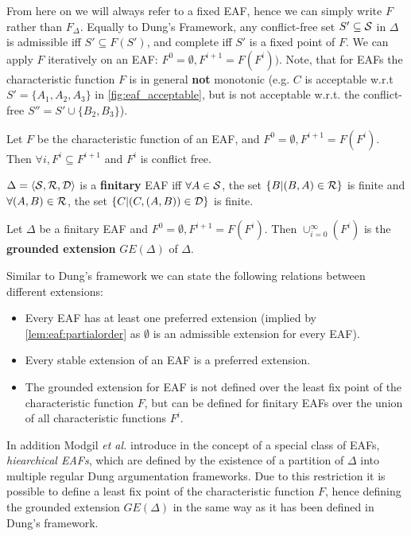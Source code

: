 From here on we will always refer to a fixed \gls{EAF}, hence we can simply write $F$ rather than $F_\Delta$. Equally to Dung's Framework, any conflict-free set $S' \subseteq \S$ in $\Delta$ is admissible iff $S' \subseteq F(S')$, and complete iff $S'$ is a fixed point of $F$. We can apply $F$ iteratively on an \gls{EAF}: $F^0 = \emptyset, F^{i+1} = F(F^i))$. Note, that for \glspl{EAF} the characteristic function $F$ is in general \textbf{not} monotonic (e.g. $C$ is acceptable w.r.t $S'= \{A_1, A_2, A_3\}$ in \autoref{fig:eaf_acceptable}, but is not acceptable w.r.t. the conflict-free $S'' = S' \cup \{B_2, B_3\}$).
\begin{lemma}
Let $F$ be the characteristic function of an \gls{EAF}, and $F^0 = \emptyset, F^{i+1} = F(F^i)$. Then $\forall i, F^i \subseteq F^{i+1}$ and $F^i$ is conflict free.
\end{lemma}


\begin{definition}
	$\Delta = \langle \S, \R, \D \rangle$ is a \textbf{finitary} \gls{EAF} iff $\forall A \in \S$, the set $\{B | (B, A) \in \R\}$ is finite and $\forall (A, B) \in \R$, the set $\{C | (C, (A, B))\in \D\}$ is finite.
\end{definition}

\begin{definition}
	Let $\Delta$ be a finitary \gls{EAF} and $F^0 = \emptyset, F^{i+1} = F(F^i)$. Then $\cup_{i=0}^\infty(F^i)$ is the \textbf{grounded extension} $GE(\Delta)$ of $\Delta$.
\end{definition}


\begin{remark}
Similar to Dung's framework we can state the following relations between different extensions:
\begin{itemize}
	\item Every \gls{EAF} has at least one preferred extension (implied by \autoref{lem:eaf:partialorder} as $\emptyset$ is an admissible extension for every \gls{EAF}).
	\item Every stable extension of an \gls{EAF} is a preferred extension.
	\item The grounded extension for \gls{EAF} is not defined over the least fix point of the characteristic function $F$, but can be defined for finitary \glspl{EAF} over the union of all characteristic functions $F^i$.
\end{itemize}	
\end{remark}

In addition Modgil \textit{et al.} introduce in \cite{Modgil2009} the concept of a special class of \glspl{EAF}, \textit{hiearchical \glspl{EAF}}, which are defined by the existence of a partition of $\Delta$ into multiple regular Dung argumentation frameworks. Due to this restriction it is possible to define a least fix point of the characteristic function $F$, hence defining the grounded extension $GE(\Delta)$ in the same way as it has been defined in Dung's framework.

